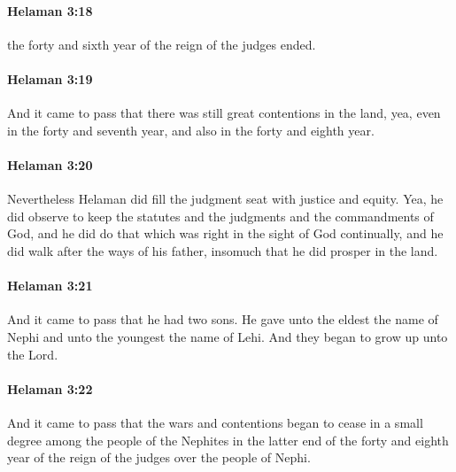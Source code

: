 		\paragraph{Helaman 3:18} %
			\label{HELAMAN-3-18}

			the forty and sixth year of the reign of the judges ended.

		\paragraph{Helaman 3:19} %
			\label{HELAMAN-3-19}

			And it came to pass that there was still great contentions in the land,
			yea, even in the forty and seventh year,
			and also in the forty and eighth year.

		\paragraph{Helaman 3:20} %
			\label{HELAMAN-3-20}

			Nevertheless Helaman did fill the judgment seat with justice and equity.
			Yea, he did observe to keep the statutes and the judgments
			and the commandments of God,
			and he did do that which was right in the sight of God continually,
			and he did walk after the ways of his father,
			insomuch that he did prosper in the land.

		\paragraph{Helaman 3:21} %
			\label{HELAMAN-3-21}

			And it came to pass that he had two sons.
			He gave unto the eldest the name of Nephi
			and unto the youngest the name of Lehi.
			And they began to grow up unto the Lord.

		\paragraph{Helaman 3:22} %
			\label{HELAMAN-3-22}

			And it came to pass that the wars and contentions began to cease
			in a small degree among the people of the Nephites
			in the latter end of the forty and eighth year
			of the reign of the judges over the people of Nephi.

